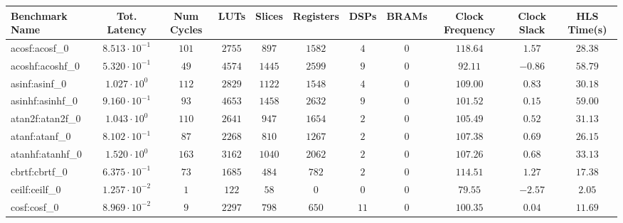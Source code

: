 \begin{tabular}{|l|c|c|c|c|c|c|c|c|c|c|}
\hline
Benchmark Name               & Tot. Latency            & Num Cycles & LUTs      & Slices    & Registers & DSPs    & BRAMs & Clock Frequency & Clock Slack & HLS Time(s) \\
\hline
acosf:acosf\_0               & $ 8.513 \cdot 10^{-1} $ & $ 101    $ & $ 2755  $ & $ 897   $ & $ 1582  $ & $ 4   $ & $ 0 $ & $ 118.64      $ & $ 1.57    $ & $ 28.38   $ \\
acoshf:acoshf\_0             & $ 5.320 \cdot 10^{-1} $ & $ 49     $ & $ 4574  $ & $ 1445  $ & $ 2599  $ & $ 9   $ & $ 0 $ & $ 92.11       $ & $ -0.86   $ & $ 58.79   $ \\
asinf:asinf\_0               & $ 1.027 \cdot 10^{0}  $ & $ 112    $ & $ 2829  $ & $ 1122  $ & $ 1548  $ & $ 4   $ & $ 0 $ & $ 109.00      $ & $ 0.83    $ & $ 30.18   $ \\
asinhf:asinhf\_0             & $ 9.160 \cdot 10^{-1} $ & $ 93     $ & $ 4653  $ & $ 1458  $ & $ 2632  $ & $ 9   $ & $ 0 $ & $ 101.52      $ & $ 0.15    $ & $ 59.00   $ \\
atan2f:atan2f\_0             & $ 1.043 \cdot 10^{0}  $ & $ 110    $ & $ 2641  $ & $ 947   $ & $ 1654  $ & $ 2   $ & $ 0 $ & $ 105.49      $ & $ 0.52    $ & $ 31.13   $ \\
atanf:atanf\_0               & $ 8.102 \cdot 10^{-1} $ & $ 87     $ & $ 2268  $ & $ 810   $ & $ 1267  $ & $ 2   $ & $ 0 $ & $ 107.38      $ & $ 0.69    $ & $ 26.15   $ \\
atanhf:atanhf\_0             & $ 1.520 \cdot 10^{0}  $ & $ 163    $ & $ 3162  $ & $ 1040  $ & $ 2062  $ & $ 2   $ & $ 0 $ & $ 107.26      $ & $ 0.68    $ & $ 33.13   $ \\
cbrtf:cbrtf\_0               & $ 6.375 \cdot 10^{-1} $ & $ 73     $ & $ 1685  $ & $ 484   $ & $ 782   $ & $ 2   $ & $ 0 $ & $ 114.51      $ & $ 1.27    $ & $ 17.38   $ \\
ceilf:ceilf\_0               & $ 1.257 \cdot 10^{-2} $ & $ 1      $ & $ 122   $ & $ 58    $ & $ 0     $ & $ 0   $ & $ 0 $ & $ 79.55       $ & $ -2.57   $ & $ 2.05    $ \\
cosf:cosf\_0                 & $ 8.969 \cdot 10^{-2} $ & $ 9      $ & $ 2297  $ & $ 798   $ & $ 650   $ & $ 11  $ & $ 0 $ & $ 100.35      $ & $ 0.04    $ & $ 11.69   $ \\

\end{tabular}
